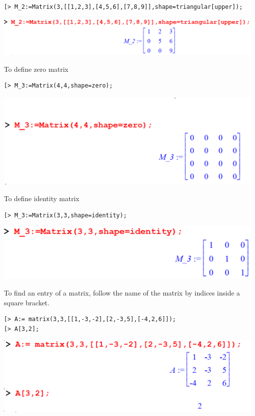 \documentclass[
]{book}
\theoremstyle{definition}
\theoremstyle{definition}
\theoremstyle{definition}
\theoremstyle{definition}
\theoremstyle{remark}
\begin{document}
\begin{verbatim}
[> M_2:=Matrix(3,[[1,2,3],[4,5,6],[7,8,9]],shape=triangular[upper]);
\end{verbatim}

\includegraphics{figures/Lesson 4/fig19.png}

To define zero matrix

\begin{verbatim}
[> M_3:=Matrix(4,4,shape=zero);
\end{verbatim}

\includegraphics{figures/Lesson 4/fig20.png}

To define identity matrix

\begin{verbatim}
[> M_3:=Matrix(3,3,shape=identity);
\end{verbatim}

\includegraphics{figures/Lesson 4/fig21.png}

To find an entry of a matrix, follow the name of the matrix by indices inside a square bracket.

\begin{verbatim}
[> A:= matrix(3,3,[[1,-3,-2],[2,-3,5],[-4,2,6]]);
[> A[3,2];
\end{verbatim}

\includegraphics{figures/Lesson 4/fig22.png}
\end{document}
